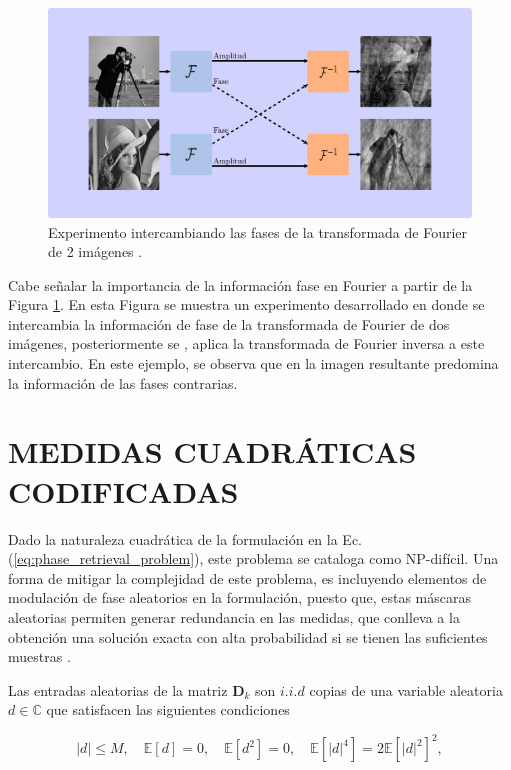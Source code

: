 \begin{figure}[H]
    \centering
    \includegraphics[width=0.8\linewidth]{images/mescla_abs_fase.pdf}
    \caption{\hspace{2mm}Experimento  intercambiando las fases de la transformada de Fourier de 2 imágenes .}
    \label{fig:mescla_fases}
\end{figure}

Cabe señalar la importancia de la información fase en Fourier a partir de la Figura \ref{fig:mescla_fases}. En esta Figura se muestra un experimento desarrollado en  donde se intercambia la información de fase de la transformada de Fourier de dos imágenes, posteriormente se , aplica la transformada de Fourier inversa a este intercambio. En este ejemplo, se observa que en la imagen resultante predomina la información de las fases contrarias.

\section{MEDIDAS CUADRÁTICAS CODIFICADAS}
Dado la naturaleza cuadrática de la formulación en la Ec. (\ref{eq:phase_retrieval_problem}), este problema se cataloga como NP-difícil. Una forma de mitigar la complejidad de este problema, es incluyendo elementos de modulación de fase aleatorios en la formulación, puesto que, estas máscaras aleatorias permiten generar redundancia en las medidas, que conlleva a la obtención una solución exacta con alta probabilidad si se tienen las suficientes muestras .

Las entradas aleatorias de la matriz  $\mathbf{D}_k$ son $i.i.d$ copias de una variable aleatoria $d \in \mathbb{C}$ que satisfacen las siguientes condiciones

\begin{equation}
    \vert d \vert \leq M, \quad \mathbb{E}[d] = 0, \quad  \mathbb{E}[d^2] = 0, \quad  \mathbb{E}[\vert d \vert^4] = 2\mathbb{E}[\vert d \vert^2]^2,    
    \label{eq:restricciones_mascara}
\end{equation}

